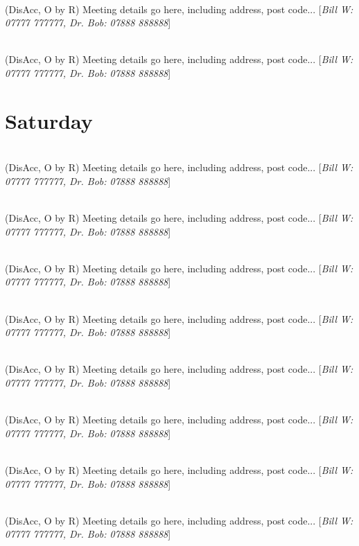 \documentclass[a4paper]{article}
\newcommand{\mtgname}[1] {\vspace{0.1cm}{\bf #1}\\}   %
\newcommand{\mtgtime}[1] {\hspace{-0.2cm}{\small #1}} %
\newcommand{\mtgdetails}[1] {#1}                      %
\newcommand{\mtgphones}[1] {[\textit{#1}]}            %
\begin{document}
\mtgname{Meeting name goes here}
\mtgtime{12:45--13:45} \mtgdetails{(DisAcc, O by R) Meeting details go here, including address, post code...}
\mtgphones{Bill W: 07777 777777, Dr. Bob: 07888 888888}

\mtgname{Meeting name goes here}
\mtgtime{12:45--13:45} \mtgdetails{(DisAcc, O by R) Meeting details go here, including address, post code...}
\mtgphones{Bill W: 07777 777777, Dr. Bob: 07888 888888}

\section*{Saturday}

\mtgname{Meeting name goes here}
\mtgtime{12:45--13:45} \mtgdetails{(DisAcc, O by R) Meeting details go here, including address, post code...}
\mtgphones{Bill W: 07777 777777, Dr. Bob: 07888 888888}

\mtgname{Meeting name goes here}
\mtgtime{12:45--13:45} \mtgdetails{(DisAcc, O by R) Meeting details go here, including address, post code...}
\mtgphones{Bill W: 07777 777777, Dr. Bob: 07888 888888}

\mtgname{Meeting name goes here}
\mtgtime{12:45--13:45} \mtgdetails{(DisAcc, O by R) Meeting details go here, including address, post code...}
\mtgphones{Bill W: 07777 777777, Dr. Bob: 07888 888888}

\mtgname{Meeting name goes here}
\mtgtime{12:45--13:45} \mtgdetails{(DisAcc, O by R) Meeting details go here, including address, post code...}
\mtgphones{Bill W: 07777 777777, Dr. Bob: 07888 888888}

\mtgname{Meeting name goes here}
\mtgtime{12:45--13:45} \mtgdetails{(DisAcc, O by R) Meeting details go here, including address, post code...}
\mtgphones{Bill W: 07777 777777, Dr. Bob: 07888 888888}

\mtgname{Meeting name goes here}
\mtgtime{12:45--13:45} \mtgdetails{(DisAcc, O by R) Meeting details go here, including address, post code...}
\mtgphones{Bill W: 07777 777777, Dr. Bob: 07888 888888}

\mtgname{Meeting name goes here}
\mtgtime{12:45--13:45} \mtgdetails{(DisAcc, O by R) Meeting details go here, including address, post code...}
\mtgphones{Bill W: 07777 777777, Dr. Bob: 07888 888888}

\mtgname{Meeting name goes here}
\mtgtime{12:45--13:45} \mtgdetails{(DisAcc, O by R) Meeting details go here, including address, post code...}
\mtgphones{Bill W: 07777 777777, Dr. Bob: 07888 888888}
\end{document}
